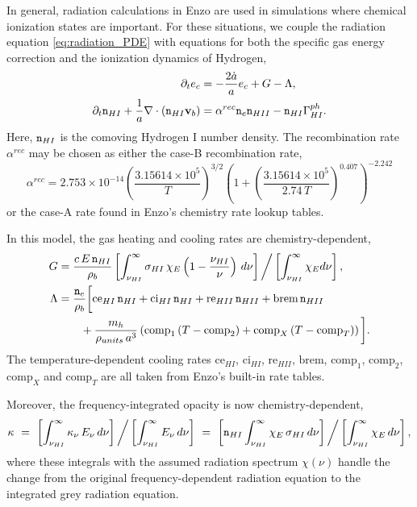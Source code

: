 \documentclass[letterpaper,10pt]{article}
\renewcommand{\(}{\left(}
\renewcommand{\)}{\right)}
\newcommand{\vb}{{\bf v}_b}
\newcommand{\rhob}{\rho_b}
\newcommand{\mn}{{\tt n}}
\begin{document}
In general, radiation calculations in Enzo are used in simulations
where chemical ionization states are important.  For these situations, 
we couple the radiation equation \eqref{eq:radiation_PDE} with
equations for both the specific gas energy correction and the
ionization dynamics of Hydrogen,
\begin{align}
  \notag
  \partial_t e_c &= -\frac{2\dot{a}}{a}e_c + G - \Lambda, \\
  \label{eq:hydrogen_ionization}
  \partial_t \mn_{HI} + \frac{1}{a}\nabla\cdot\(\mn_{HI}\vb\) &=
    \alpha^{rec} \mn_e \mn_{HII} - \mn_{HI} \Gamma_{HI}^{ph}. 
\end{align}
Here, $\mn_{HI}$ is the comoving Hydrogen I number density.  The
recombination rate $\alpha^{rec}$ may be chosen as either the case-B
recombination rate, 
\begin{equation}
\label{eq:alphaB}
\alpha^{rec} = 2.753\times 10^{-14} \left(\frac{3.15614\times 10^5}{T}\right)^{3/2} 
                   \left(1+\left(\frac{3.15614\times 10^5}{2.74\, T}\right)^{0.407}\right)^{-2.242} 
\end{equation}
or the case-A rate found in Enzo's chemistry rate lookup tables.

In this model, the gas heating and cooling rates are
chemistry-dependent, 
\begin{align}
  \label{eq:G_nLTE}
  G &= \frac{c\,E\,\mn_{HI}}{\rhob} 
    \left[\int_{\nu_{HI}}^{\infty} \sigma_{HI}\, \chi_E
    \left(1-\frac{\nu_{HI}}{\nu}\right)\, d\nu\right] \bigg/
    \left[\int_{\nu_{HI}}^{\infty} \chi_E d\nu\right], \\
\label{eq:Lambda_nLTE}
  \Lambda &= \frac{\mn_e}{\rhob}\bigg[\text{ce}_{HI}\, \mn_{HI} 
  + \text{ci}_{HI}\, \mn_{HI} + \text{re}_{HII}\, \mn_{HII} + \text{brem}\,
  \mn_{HII} \\
  \notag &\qquad+ \frac{m_h}{\rho_{units}\, a^3} \left(\text{comp}_1\, (T-\text{comp}_2) 
    + \text{comp}_{X}\, (T-\text{comp}_{T})\right) \bigg].
\end{align}
The temperature-dependent cooling rates
$\text{ce}_{HI}$, $\text{ci}_{HI}$, $\text{re}_{HII}$, $\text{brem}$,
$\text{comp}_1$, $\text{comp}_2$, $\text{comp}_{X}$ and
$\text{comp}_{T}$ are all taken from Enzo's built-in rate tables.

Moreover, the frequency-integrated opacity is now chemistry-dependent,
\begin{equation}
\label{eq:opacityHI}
  \kappa \ = \ 
  \left[\int_{\nu_{HI}}^{\infty} \kappa_{\nu}\,E_{\nu}\,d\nu\right] \bigg/
  \left[\int_{\nu_{HI}}^{\infty} E_{\nu}\,d\nu\right] \ = \ 
  \left[\mn_{HI} \int_{\nu_{HI}}^{\infty}
    \chi_E\,\sigma_{HI}\,d\nu\right] \bigg/
  \left[\int_{\nu_{HI}}^{\infty} \chi_E\,d\nu\right],
\end{equation}
where these integrals with the assumed radiation spectrum $\chi(\nu)$
handle the change from the original frequency-dependent radiation
equation to the integrated grey radiation equation. 
\end{document}
